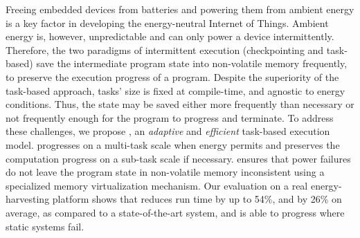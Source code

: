 Freeing embedded devices from batteries and powering them from ambient energy is a key factor in developing the energy-neutral Internet of Things.
Ambient energy is, however, unpredictable and can only power a device intermittently.
Therefore, the two paradigms of intermittent execution (checkpointing and task-based) save the intermediate program state into non-volatile memory frequently, to preserve the execution progress of a program.
Despite the superiority of the task-based approach, tasks' size is fixed at compile-time, and agnostic to energy conditions.
Thus, the state may be saved either more frequently than necessary or not frequently enough for the program to progress and terminate.
To address these challenges, we propose \sys, an \emph{adaptive} and \emph{efficient} task-based execution model.
\sys progresses on a multi-task scale when energy permits and preserves the computation progress on a sub-task scale if necessary.
\sys ensures that power failures do not leave the program state in non-volatile memory inconsistent using a specialized memory virtualization mechanism.
Our evaluation on a real energy-harvesting platform shows that \sys reduces run time by up to 54\%, and by 26\% on average, as compared to a state-of-the-art system, and is able to progress where static systems fail.
